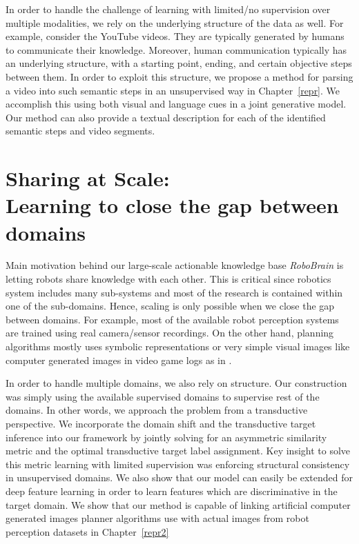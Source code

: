 In order to handle the challenge of learning with limited/no supervision over multiple modalities, we rely on the underlying structure of the data as well. For example, consider the YouTube videos. They are typically generated by humans to communicate their knowledge. Moreover, human communication typically has an underlying structure, with a starting point, ending, and certain objective steps between them. In order to exploit this structure, we propose a method for parsing a video into such semantic steps in an unsupervised way in Chapter~\ref{repr}. We accomplish this using both visual and language cues in a joint generative model. Our method can also provide a textual description for each of the identified semantic steps and video segments. 

\section{Sharing at Scale: \\ Learning to close the gap between domains}
Main motivation behind our large-scale actionable knowledge base \emph{RoboBrain} is letting robots share knowledge with each other. This is critical since robotics system includes many sub-systems and most of the research is contained within one of the sub-domains. Hence, scaling is only possible when we close the gap between domains. For example, most of the available robot perception systems are trained using real camera/sensor recordings. On the other hand, planning algorithms mostly uses symbolic representations or very simple visual images like computer generated images in video game logs as in \cite{misra2014tell}.

In order to handle multiple domains, we also rely on structure. Our construction was simply using the available supervised domains to supervise rest of the domains. In other words, we approach the problem from a transductive perspective. We incorporate the domain shift and the transductive target inference into our framework by jointly solving for an asymmetric similarity metric and the optimal transductive target label assignment. Key insight to solve this metric learning with limited supervision was enforcing structural consistency in unsupervised domains. We also show that our model can easily be extended for deep feature learning in order to learn features which are discriminative in the target domain. We show that our method is capable of linking artificial computer generated images planner algorithms use with actual images from robot perception datasets in Chapter~\ref{repr2}

